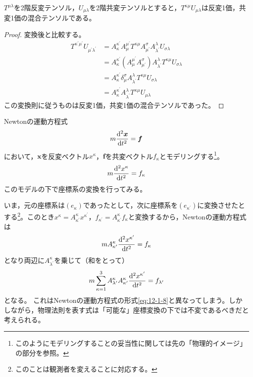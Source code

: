\documentclass[uplatex]{jsarticle}
\begin{document}
\begin{hodai}
  $T^{\mu\lambda}$を2階反変テンソル，$U_{\mu\lambda}$を2階共変テンソルとすると，$T^{\kappa\mu}U_{\mu\lambda}$は反変1価，共変1価の混合テンソルである。
\end{hodai}
\begin{proof}
  変換後と比較する。
  \begin{align*}
    T^{\kappa^{\prime} \mu^{\prime}} U_{\mu^{\prime} \lambda^{\prime}} &= A_{\kappa}^{\kappa^{\prime}} A_{\mu}^{\mu^{\prime}} T^{\kappa \mu} A_{\mu^{\prime}}^{\sigma} A_{\lambda^{\prime}}^{\lambda} U_{\sigma\lambda} \\
    &= A_{\kappa}^{\kappa^{\prime}} \left( A_{\mu}^{\mu^{\prime}} A_{\mu^{\prime}}^{\sigma} \right) A_{\lambda^{\prime}}^{\lambda} T^{\kappa \mu} U_{\sigma\lambda} \\
    &= A_{\kappa}^{\kappa^{\prime}} \delta_{\mu}^{\sigma} A_{\lambda^{\prime}}^{\lambda} T^{\kappa \mu} U_{\sigma\lambda} \\
    &= A_{\kappa}^{\kappa^{\prime}} A_{\lambda^{\prime}}^{\lambda} T^{\kappa \mu} U_{\mu\lambda}
  \end{align*}
  この変換則に従うものは反変1価，共変1価の混合テンソルであった。
\end{proof}

\sukima{}\par
Newtonの運動方程式
\begin{align}
  m \dfrac{\mathrm{d}^{2}\bm{x}}{\mathrm{d}t^{2}} = \bm{f}
\end{align}
において，$\bm{x}$を反変ベクトル$x^{\kappa}$，$\bm{f}$を共変ベクトル$f_{\kappa}$とモデリングする\footnote{このようにモデリングすることの妥当性に関しては先の「物理的イメージ」の部分を参照。}。
\begin{align}
  m \dfrac{\mathrm{d}^{2}x^{\kappa}}{\mathrm{d}t^{2}} = f_{\kappa} \label{eq:12-1-8}
\end{align}
このモデルの下で座標系の変換を行ってみる。

いま，元の座標系は$(e_{\kappa})$であったとして，次に座標系を$(e_{\kappa^{\prime}})$に変換させたとする\footnote{このことは観測者を変えることに対応する。}。このとき$x^{\kappa} = A_{\kappa^{\prime}}^{\kappa} x^{\kappa^{\prime}}$，$f_{\kappa^{\prime}} = A_{\kappa^{\prime}}^{\kappa} f_{\kappa}$と変換するから，Newtonの運動方程式は
\begin{align*}
  m A_{\kappa^{\prime}}^{\kappa} \dfrac{\mathrm{d}^{2}x^{\kappa^{\prime}}}{\mathrm{d}t^{2}} = f_{\kappa}
\end{align*}
となり両辺に$A_{\lambda^{\prime}}^{\kappa}$を乗じて（和をとって）
\begin{align*}
  m \sum_{\kappa=1}^{3} A_{\lambda^{\prime}}^{\kappa} A_{\kappa^{\prime}}^{\kappa} \dfrac{\mathrm{d}^{2}x^{\kappa^{\prime}}}{\mathrm{d}t^{2}} = f_{\lambda^{\prime}}
\end{align*}
となる。 これはNewtonの運動方程式の形式\eqref{eq:12-1-8}と異なってしまう。しかしながら，物理法則を表す式は「可能な」座標変換の下では不変であるべきだと考えられる。
\end{document}
